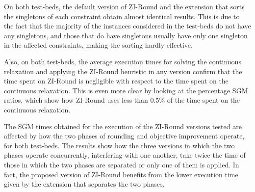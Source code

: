 \documentclass[a4paper,12pt,twoside]{scrbook}
\begin{document}
On both test-beds, the default version of ZI-Round and the extension that sorts the singletons of each constraint obtain almost identical results. This is due to the fact that the majority of the instances considered in the test-beds do not have any singletons, and those that do have singletons usually have only one singleton in the affected constraints, making the sorting hardly effective. \par 

Also, on both test-beds, the average execution times for solving the continuous relaxation and applying the ZI-Round heuristic in any version confirm that the time spent on ZI-Round is negligible with respect to the time spent on the continuous relaxation. This is even more clear by looking at the percentage SGM ratios, which show how ZI-Round uses less than $0.5\%$ of the time spent on the continuous relaxation. \par

The SGM times obtained for the execution of the ZI-Round versions tested are affected by how the two phases of rounding and objective improvement operate, for both test-beds. The results show how the three versions in which the two phases operate concurrently, interfering with one another, take twice the time of those in which the two phases are separated or only one of them is applied.
In fact, the proposed version of ZI-Round benefits from the lower execution time given by the extension that separates the two phases. \par
\end{document}

